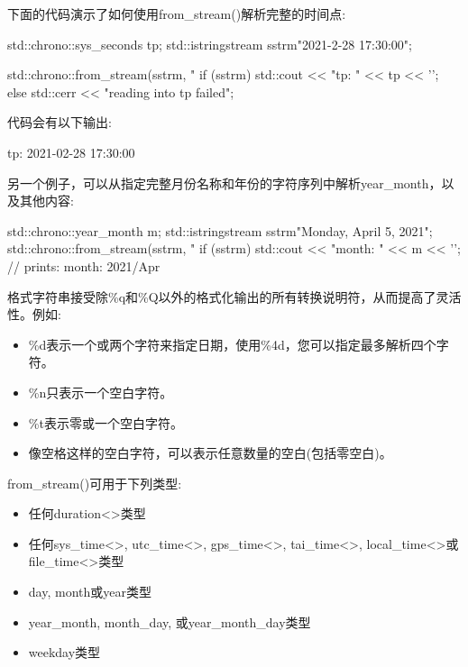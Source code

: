 
下面的代码演示了如何使用from\_stream()解析完整的时间点:

\begin{cpp}
std::chrono::sys_seconds tp;
std::istringstream sstrm{"2021-2-28 17:30:00"};

std::chrono::from_stream(sstrm, "%
if (sstrm) {
	std::cout << "tp: " << tp << '\n';
}
else {
	std::cerr << "reading into tp failed\n";
}
\end{cpp}

代码会有以下输出:

\begin{shell}
tp: 2021-02-28 17:30:00
\end{shell}

另一个例子，可以从指定完整月份名称和年份的字符序列中解析year\_month，以及其他内容:

\begin{cpp}
std::chrono::year_month m;
std::istringstream sstrm{"Monday, April 5, 2021"};
std::chrono::from_stream(sstrm, "%
if (sstrm) {
	std::cout << "month: " << m << '\n'; // prints: month: 2021/Apr
}
\end{cpp}

格式字符串接受除\%q和\%Q以外的格式化输出的所有转换说明符，从而提高了灵活性。例如:

\begin{itemize}
\item 
\%d表示一个或两个字符来指定日期，使用\%4d，您可以指定最多解析四个字符。

\item 
\%n只表示一个空白字符。

\item 
\%t表示零或一个空白字符。

\item 
像空格这样的空白字符，可以表示任意数量的空白(包括零空白)。
\end{itemize}

from\_stream()可用于下列类型:

\begin{itemize}
\item 
任何duration<>类型

\item 
任何sys\_time<>, utc\_time<>, gps\_time<>, tai\_time<>, local\_time<>或file\_time<>类型

\item 
day, month或year类型

\item 
year\_month, month\_day, 或year\_month\_day类型

\item 
weekday类型
\end{itemize}

